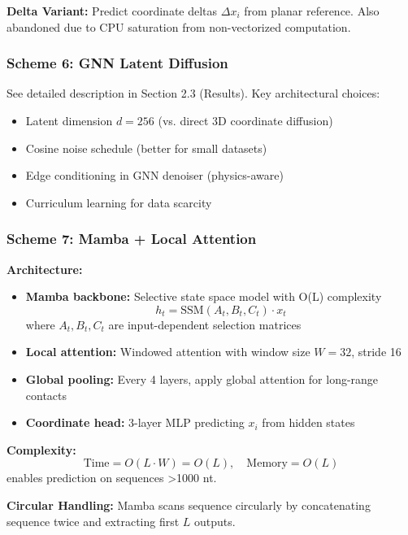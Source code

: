 \documentclass[12pt]{article}
\begin{document}
\textbf{Delta Variant:} Predict coordinate deltas $\Delta x_i$ from planar reference. Also abandoned due to CPU saturation from non-vectorized computation.

\subsubsection{Scheme 6: GNN Latent Diffusion}

See detailed description in Section 2.3 (Results). Key architectural choices:
\begin{itemize}
\item Latent dimension $d=256$ (vs. direct 3D coordinate diffusion)
\item Cosine noise schedule (better for small datasets)
\item Edge conditioning in GNN denoiser (physics-aware)
\item Curriculum learning for data scarcity
\end{itemize}

\subsubsection{Scheme 7: Mamba + Local Attention}

\textbf{Architecture:}
\begin{itemize}
\item \textbf{Mamba backbone:} Selective state space model with O(L) complexity
\begin{equation}
h_t = \text{SSM}(A_t, B_t, C_t) \cdot x_t
\end{equation}
where $A_t, B_t, C_t$ are input-dependent selection matrices
\item \textbf{Local attention:} Windowed attention with window size $W=32$, stride 16
\item \textbf{Global pooling:} Every 4 layers, apply global attention for long-range contacts
\item \textbf{Coordinate head:} 3-layer MLP predicting $x_i$ from hidden states
\end{itemize}

\textbf{Complexity:}
\begin{equation}
\text{Time} = O(L \cdot W) = O(L), \quad \text{Memory} = O(L)
\end{equation}
enables prediction on sequences >1000 nt.

\textbf{Circular Handling:} Mamba scans sequence circularly by concatenating sequence twice and extracting first $L$ outputs.
\end{document}
